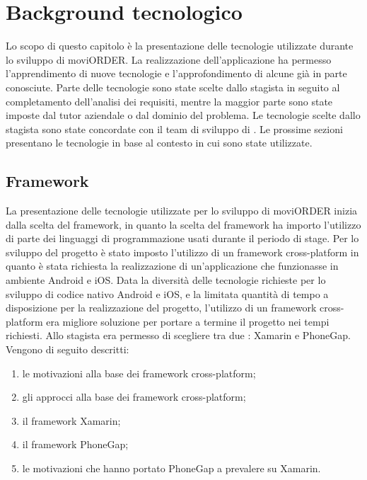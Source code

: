
\chapter{Background tecnologico}

Lo scopo di questo capitolo è la presentazione delle tecnologie utilizzate durante lo sviluppo di moviORDER. La realizzazione dell'applicazione ha permesso l'apprendimento di nuove tecnologie e l'approfondimento di alcune già in parte conosciute. Parte delle tecnologie sono state scelte dallo stagista in seguito al completamento dell'analisi dei requisiti, mentre la maggior parte sono state imposte dal tutor aziendale o dal dominio del problema. Le tecnologie scelte dallo stagista sono state concordate con il team di sviluppo di \visione{}. Le prossime sezioni presentano le tecnologie in base al contesto in cui sono state utilizzate.

\section{Framework}	

La presentazione delle tecnologie utilizzate per lo sviluppo di moviORDER inizia dalla scelta del framework, in quanto la scelta del framework ha importo l'utilizzo di parte dei linguaggi di programmazione usati durante il periodo di stage. Per lo sviluppo del progetto è stato imposto l'utilizzo di un framework cross-platform in quanto è stata richiesta la realizzazione di un'applicazione che funzionasse in ambiente Android e iOS. Data la diversità delle tecnologie richieste per lo sviluppo di codice nativo Android e iOS, e la limitata quantità di tempo a disposizione per la realizzazione del progetto, l'utilizzo di un framework cross-platform era migliore soluzione per portare a termine il progetto nei tempi richiesti. Allo stagista era permesso di scegliere tra due : Xamarin e PhoneGap.\\ Vengono di seguito descritti:
\begin{enumerate}
	\item le motivazioni alla base dei framework cross-platform;
	\item gli approcci alla base dei framework cross-platform;
	\item il framework Xamarin;
	\item il framework PhoneGap;
	\item le motivazioni che hanno portato PhoneGap a prevalere su Xamarin.
\end{enumerate}

